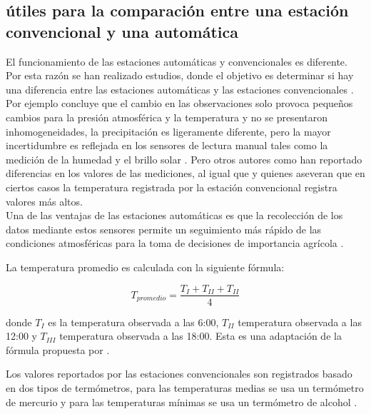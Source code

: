 

\subsection{útiles para la comparación entre una estación convencional y una automática}

El funcionamiento de las estaciones automáticas y convencionales es diferente. Por esta razón se han realizado estudios, donde el objetivo es determinar si hay una diferencia entre las estaciones automáticas y las estaciones convencionales \citep{auchmann2012physics}. Por ejemplo \citet{augter2013vergleich} concluye que el cambio en las observaciones solo provoca pequeños cambios para la presión atmosférica y la temperatura y no se presentaron inhomogeneidades, la precipitación es ligeramente diferente, pero la mayor incertidumbre es reflejada en los sensores de lectura manual tales como la medición de la humedad y el brillo solar \citep{augter2013vergleich}. Pero otros autores como \citet{kamtz1831lehrbuch} han reportado diferencias en los valores de las mediciones, al igual que \citet{lacombe2010results} y \citep{kaspar2016climate} quienes aseveran que en ciertos casos la temperatura registrada por la estación convencional registra valores más altos.\\

Una de las ventajas de las estaciones automáticas es que la recolección de los datos mediante estos sensores permite un seguimiento más rápido de las condiciones atmosféricas para la toma de decisiones de importancia agrícola \citep{Soares2017}.

La temperatura promedio es calculada con la siguiente fórmula:

\begin{equation}\label{fx:promedio}
T_{promedio} = \frac{T_{I} + T_{II} +T_{II}}{4}
\end{equation}

donde $T_{I}$ es la temperatura observada a las 6:00, $T_{II}$ temperatura observada a las 12:00 y $T_{III}$ temperatura observada a las 18:00. Esta es una adaptación de la fórmula propuesta por \citet{kamtz1831lehrbuch}.

Los valores reportados por las estaciones convencionales son registrados basado en dos tipos de termómetros, para las temperaturas medias se usa un termómetro de mercurio y para las temperaturas mínimas se usa un termómetro de alcohol \citep{augter2013vergleich}. 

